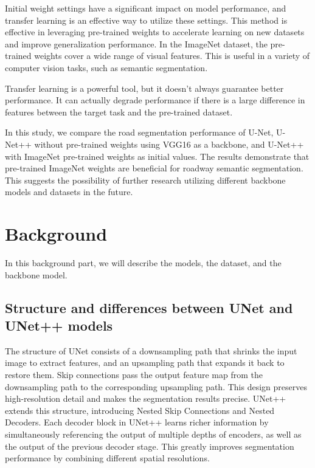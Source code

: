 \documentclass[10pt,twocolumn,letterpaper,final]{article} %
\begin{document}
Initial weight settings have a significant impact on model performance, and transfer learning is an effective way to utilize these settings. This method is effective in leveraging pre-trained weights to accelerate learning on new datasets and improve generalization performance. In the ImageNet dataset, the pre-trained weights cover a wide range of visual features. This is useful in a variety of computer vision tasks, such as semantic segmentation.

Transfer learning is a powerful tool, but it doesn't always guarantee better performance. It can actually degrade performance if there is a large difference in features between the target task and the pre-trained dataset. 

In this study, we compare the road segmentation performance of U-Net, U-Net++ without pre-trained weights using VGG16 as a backbone, and U-Net++ with ImageNet pre-trained weights as initial values.  The results demonstrate that pre-trained ImageNet weights are beneficial for roadway semantic segmentation. 
This suggests the possibility of further research utilizing different backbone models and datasets in the future.

\section{Background}
\label{sec:intro}

In this background part, we will describe the models, the dataset, and the backbone model.
\subsection{Structure and differences between UNet and UNet++ models}
The structure of UNet consists of a downsampling path that shrinks the input image to extract features, and an upsampling path that expands it back to restore them. Skip connections pass the output feature map from the downsampling path to the corresponding upsampling path. This design preserves high-resolution detail and makes the segmentation results precise.
UNet++ extends this structure, introducing Nested Skip Connections and Nested Decoders. Each decoder block in UNet++ learns richer information by simultaneously referencing the output of multiple depths of encoders, as well as the output of the previous decoder stage. This greatly improves segmentation performance by combining different spatial resolutions.
\end{document}
